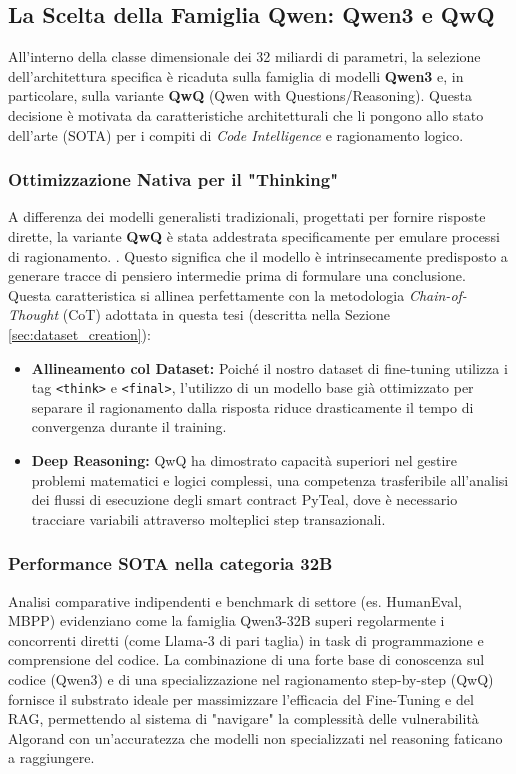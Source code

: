 \subsection{La Scelta della Famiglia Qwen: Qwen3 e QwQ}
\label{sec:qwen_selection}

All'interno della classe dimensionale dei 32 miliardi di parametri, la selezione dell'architettura specifica è ricaduta sulla famiglia di modelli \textbf{Qwen3} e, in particolare, sulla variante \textbf{QwQ} (Qwen with Questions/Reasoning). Questa decisione è motivata da caratteristiche architetturali che li pongono allo stato dell'arte (SOTA) per i compiti di \textit{Code Intelligence} e ragionamento logico.

\subsubsection{Ottimizzazione Nativa per il "Thinking"}
A differenza dei modelli generalisti tradizionali, progettati per fornire risposte dirette, la variante \textbf{QwQ} è stata addestrata specificamente per emulare processi di ragionamento. \cite{wang2025larger}. Questo significa che il modello è intrinsecamente predisposto a generare tracce di pensiero intermedie prima di formulare una conclusione.
Questa caratteristica si allinea perfettamente con la metodologia \textit{Chain-of-Thought} (CoT) adottata in questa tesi (descritta nella Sezione \ref{sec:dataset_creation}):
\begin{itemize}
    \item \textbf{Allineamento col Dataset:} Poiché il nostro dataset di fine-tuning utilizza i tag \texttt{<think>} e \texttt{<final>}, l'utilizzo di un modello base già ottimizzato per separare il ragionamento dalla risposta riduce drasticamente il tempo di convergenza durante il training.
    \item \textbf{Deep Reasoning:} QwQ ha dimostrato capacità superiori nel gestire problemi matematici e logici complessi, una competenza trasferibile all'analisi dei flussi di esecuzione degli smart contract PyTeal, dove è necessario tracciare variabili attraverso molteplici step transazionali.
\end{itemize}

\subsubsection{Performance SOTA nella categoria 32B}
Analisi comparative indipendenti e benchmark di settore (es. HumanEval, MBPP) evidenziano come la famiglia Qwen3-32B superi regolarmente i concorrenti diretti (come Llama-3 di pari taglia) in task di programmazione e comprensione del codice.
La combinazione di una forte base di conoscenza sul codice (Qwen3) e di una specializzazione nel ragionamento step-by-step (QwQ) fornisce il substrato ideale per massimizzare l'efficacia del Fine-Tuning e del RAG, permettendo al sistema di "navigare" la complessità delle vulnerabilità Algorand con un'accuratezza che modelli non specializzati nel reasoning faticano a raggiungere.

